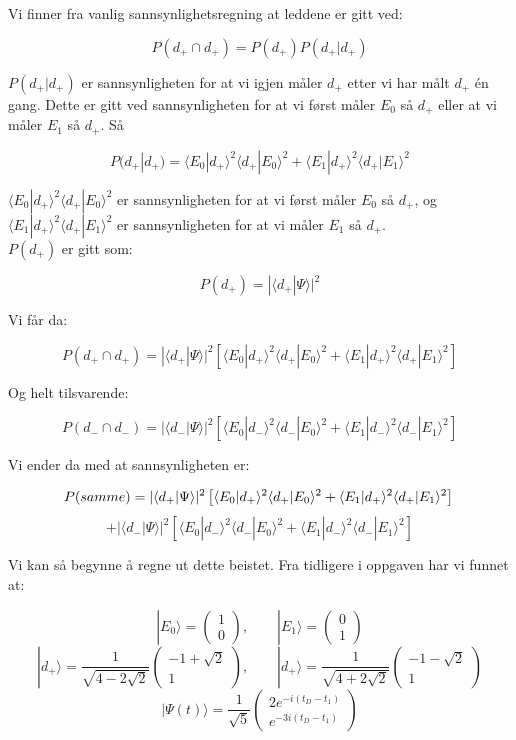 \documentclass[a4paper,norsk, 10pt]{article}
\numberwithin{equation}{section}
\begin{document}
Vi finner fra vanlig sannsynlighetsregning at leddene er gitt ved:

$$
P(d_+ \cap d_+) = P(d_+)P(d_+|d_+)
$$

$P(d_+|d_+)$ er sannsynligheten for at vi igjen måler $d_+$ etter vi har målt $d_+$ én gang. Dette er gitt ved sannsynligheten for at vi først måler $E_0$ så $d_+$ eller at vi måler $E_1$ så $d_+$. Så

$$
P(d_+|d_+) = \langle E_0|d_+\rangle^2\langle d_+|E_0\rangle^2 + \langle E_1|d_+\rangle^2\langle d_+|E_1\rangle^2
$$

$\langle E_0|d_+\rangle^2\langle d_+|E_0\rangle^2$ er sannsynligheten for at vi først måler $E_0$ så $d_+$, og $\langle E_1|d_+\rangle^2\langle d_+|E_1\rangle^2$ er sannsynligheten for at vi måler $E_1$ så $d_+$. \\

$P(d_+)$ er gitt som:

$$
P(d_+) = |\langle d_+|\Psi\rangle|^2
$$

Vi får da:

$$
P(d_+ \cap d_+) = |\langle d_+|\Psi\rangle|^2\left[\langle E_0|d_+\rangle^2\langle d_+|E_0\rangle^2 + \langle E_1|d_+\rangle^2\langle d_+|E_1\rangle^2\right]
$$


Og helt tilsvarende:

$$
P(d_- \cap d_-) = |\langle d_-|\Psi\rangle|^2\left[\langle E_0|d_-\rangle^2\langle d_-|E_0\rangle^2 + \langle E_1|d_-\rangle^2\langle d_-|E_1\rangle^2\right]
$$

Vi ender da med at sannsynligheten er:

$$
P(samme) = |\langle d_+|\Psi\rangle|^2\left[\langle E_0|d_+\rangle^2\langle d_+|E_0\rangle^2 + \langle E_1|d_+\rangle^2\langle d_+|E_1\rangle^2\right] \\
$$
$$
+
 |\langle d_-|\Psi\rangle|^2\left[\langle E_0|d_-\rangle^2\langle d_-|E_0\rangle^2 + \langle E_1|d_-\rangle^2\langle d_-|E_1\rangle^2\right]
$$

Vi kan så begynne å regne ut dette beistet. Fra tidligere i oppgaven har vi funnet at:

$$
|E_0\rangle = 
\begin{pmatrix}
1\\0
\end{pmatrix}
, \qquad
|E_1\rangle = 
\begin{pmatrix}
0\\1
\end{pmatrix}
$$
$$
|d_+\rangle = 
\frac{1}{\sqrt{4-2\sqrt{2}}}
\begin{pmatrix}
-1+\sqrt{2}\\1
\end{pmatrix}
,\qquad
|d_+\rangle = 
\frac{1}{\sqrt{4+2\sqrt{2}}}
\begin{pmatrix}
-1-\sqrt{2}\\1
\end{pmatrix}
$$
$$
|\Psi(t)\rangle = \frac{1}{\sqrt{5}}
\begin{pmatrix}
2e^{-i(t_D-t_1)} \\ e^{-3i(t_D-t_1)}
\end{pmatrix}
$$
\end{document}
